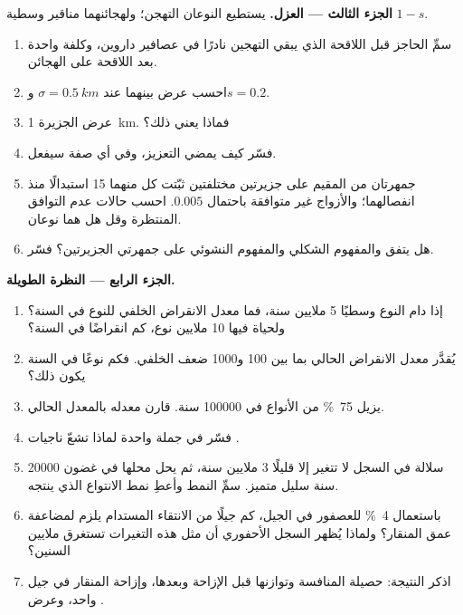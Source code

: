 \begin{problem}
\medskip
\noindent\textbf{الجزء الثالث --- العزل.}
يستطيع النوعان التهجن؛ ولهجائنهما مناقير وسطية
 $1 - s$.
\begin{enumerate}[resume]
  \item سمِّ الحاجز قبل اللاقحة الذي يبقي التهجين نادرًا
        في عصافير داروين، وكلفة واحدة بعد اللاقحة على
        الهجائن.
  \item احسب عرض  بينهما عند $\sigma
        = \qty{0.5}{km}$ و$s = 0.2$.
  \item عرض الجزيرة \qty{1}{km}. فماذا يعني ذلك؟
  \item فسّر كيف يمضي التعزيز، وفي أي صفة
        سيفعل.
  \item جمهرتان من المقيم على جزيرتين مختلفتين ثبّتت كل
        منهما 15 استبدالًا منذ انفصالهما؛ والأزواج
        غير متوافقة باحتمال $0.005$. احسب حالات عدم التوافق المنتظرة
        وقل هل هما نوعان.
  \item هل يتفق  والمفهوم الشكلي
        والمفهوم النشوئي على جمهرتي
        الجزيرتين؟ فسّر.
\end{enumerate}

\medskip
\noindent\textbf{الجزء الرابع --- النظرة الطويلة.}
\begin{enumerate}[resume]
  \item إذا دام النوع وسطيًا 5 ملايين سنة، فما
        معدل الانقراض الخلفي للنوع في السنة؟ ولحياة
        فيها 10 ملايين نوع، كم انقراضًا في السنة؟
  \item يُقدَّر معدل الانقراض الحالي بما بين 100 و1000
        ضعف الخلفي. فكم نوعًا في السنة يكون ذلك؟
  \item {} يزيل \qty{75}{\%} من الأنواع في
        \num{100000} سنة. قارن معدله بالمعدل الحالي.
  \item فسّر في جملة واحدة لماذا تشعّ ناجيات .
  \item سلالة في السجل لا تتغير إلا قليلًا 3 ملايين سنة،
        ثم يحل محلها في غضون \num{20000} سنة سليل متميز.
        سمِّ النمط وأعطِ نمط الانتواع الذي ينتجه.
  \item باستعمال \qty{4}{\%} للعصفور في الجيل، كم
        جيلًا من الانتقاء المستدام يلزم لمضاعفة عمق المنقار؟
        ولماذا يُظهر السجل الأحفوري أن مثل هذه التغيرات تستغرق ملايين
        السنين؟
  \item اذكر النتيجة: حصيلة المنافسة وتوازنها قبل
        الإزاحة وبعدها، وإزاحة المنقار
        في جيل واحد، وعرض .
\end{enumerate}
\end{problem}
